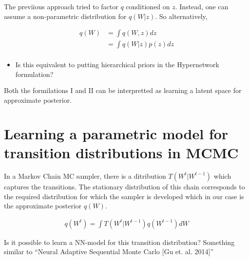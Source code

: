 \documentclass[twoside]{article}
\begin{document}
The previious approach tried to factor $q$ conditioned on $z$. Instead, one can assume a non-parametric distribution for $q(W|z)$. So alternatively,


\begin{align}
q(W) &= \int q(W,z)dz\\
&= \int q(W|z)p(z)dz\\
\end{align}

\begin{itemize}
  \item Is this equivalent to putting hierarchical priors in the Hypernetwork formulation? 
\end{itemize}

Both the formilations I and II can be interpretted as learning a latent space for approximate posterior. 

 
\section{Learning a parametric model for transition distributions in MCMC}

In a Markov Chain MC sampler, there is a ditribution $T(W^{t}|W^{t-1})$ which captures the transitions. The stationary distribution of this chain corresponds to the required distribution for which the sampler is developed which in our case is the approximate posterior $q(W)$. 

\begin{align}
q(W^t) = \int T(W^{t}|W^{t-1})q(W^{t-1})dW
\end{align}

Is it possible to learn a NN-model for this transition distribution? Something similar to ``Neural Adaptive Sequential Monte Carlo [Gu et. al. 2014]''



%
%
\end{document}
